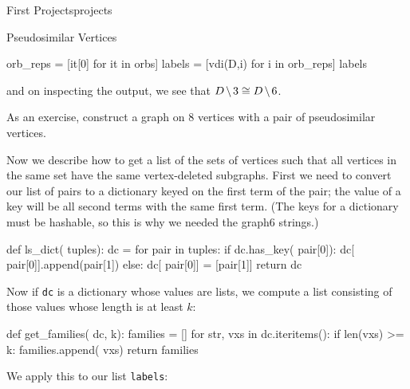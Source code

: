 \begin{chap}{First Projects}{projects}
\begin{sect}{Pseudosimilar Vertices}
\begin{sagecode}
\begin{sageinput}
orb_reps = [it[0] for it in orbs]
labels = [vdi(D,i) for i in orb_reps]
labels
\end{sageinput}
\begin{sageoutput}
\end{sageoutput}
\end{sagecode}
%
\begin{para}
and on inspecting the output, we see that $D\mathbin{\mkern-1.5mu\setminus\mkern-1.5mu} 3\cong D\mathbin{\mkern-1.5mu\setminus\mkern-1.5mu} 6$.
\end{para}
%
\begin{para}
As an exercise, construct a graph on 8 vertices with a pair of pseudosimilar
vertices.
\end{para}
%
\begin{para}
Now we describe how to get a list of the sets of vertices such that all
vertices in the same set have the same vertex-deleted subgraphs.
First we need to convert our list of pairs to a dictionary keyed on the 
first term of the pair; the value of a key will be all second terms 
with the same first term. (The keys for a dictionary must be hashable, so this
is why we needed the graph6 strings.)
\end{para}
%
\begin{sagecode}
\begin{sageinput}
def ls_dict( tuples):
    dc = {} 
    for pair in tuples:
        if dc.has_key( pair[0]):
            dc[ pair[0]].append(pair[1])
        else:
            dc[ pair[0]] = [pair[1]]
    return dc
\end{sageinput}
\end{sagecode}
%
\begin{para}
Now if \verb|dc| is a dictionary whose values are lists, we compute a list consisting
of those values whose length is at least $k$:
\end{para}
%
\begin{sagecode}
\begin{sageinput}
def get_families( dc, k):
    families = []
    for str, vxs in dc.iteritems():
        if len(vxs) >= k:
            families.append( vxs)
    return families
\end{sageinput}
\end{sagecode}
%
\begin{para}
We apply this to our list \texttt{labels}:
\end{para}
%
\begin{sagecode}

\end{sagecode}
\end{sect}
\end{chap}
